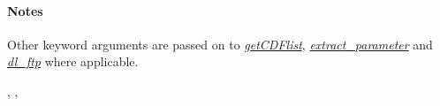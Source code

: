\documentclass[letterpaper,10pt,english]{sphinxhowto}
\begin{document}
\begin{fulllineitems}
\paragraph{Notes}

Other keyword arguments are passed on to {\hyperref[swtools_doc:getcdflist]{\emph{getCDFlist}}},
{\hyperref[swtools_doc:extract\string-parameter]{\emph{extract\_parameter}}} and {\hyperref[swtools_doc:dl\string-ftp]{\emph{dl\_ftp}}} where applicable.




{\hyperref[swtools_doc:swtools.getCDFlist]{\emph{}}}, {\hyperref[swtools_doc:swtools.extract_parameter]{\emph{}}}, {\hyperref[swtools_doc:swtools.dl_ftp]{\emph{}}}



\end{fulllineitems}

\end{document}
